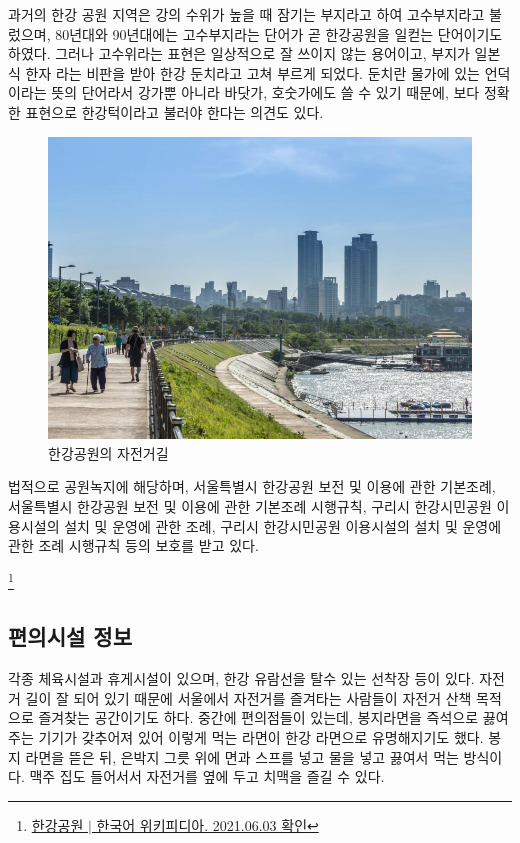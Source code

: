 
과거의 한강 공원 지역은 강의 수위가 높을 때 잠기는 부지라고 하여 고수부지라고 
불렀으며, 80년대와 90년대에는 고수부지라는 단어가 곧 한강공원을 일컫는 단어이기도 
하였다. 그러나 고수위라는 표현은 일상적으로 잘 쓰이지 않는 용어이고, 부지가 일본식 한자
라는 비판을 받아 한강 둔치라고 고쳐 부르게 되었다. 둔치란 물가에 있는 언덕이라는 
뜻의 단어라서 강가뿐 아니라 바닷가, 호숫가에도 쓸 수 있기 때문에, 보다 정확한 표현으로
한강턱이라고 불러야 한다는 의견도 있다.



\begin{figure}
    \centering
    \includegraphics[width=.6\textwidth]{e_img/ww_-001.jpg}
    \caption{한강공원의 자전거길}
    \label{fig:haryu3}
\end{figure}


법적으로 공원녹지에 해당하며, 서울특별시 한강공원 보전 및 이용에 관한 기본조례,
서울특별시 한강공원 보전 및 이용에 관한 기본조례 시행규칙, 구리시 한강시민공원 이용시설의
 설치 및 운영에 관한 조례, 구리시 한강시민공원 이용시설의 설치 및 운영에 관한
조례 시행규칙 등의 보호를 받고 있다.

\footnote{\href{https://ko.wikipedia.org/wiki/한강공원}{한강공원 $|$ 한국어 위키피디아. 2021.06.03 확인}}
\subsection{편의시설 정보}

각종 체육시설과 휴게시설이 있으며, 한강 유람선을 탈수 있는 선착장 등이 있다. 자전거
길이 잘 되어 있기 때문에 서울에서 자전거를 즐겨타는 사람들이 자전거 산책 목적으로
즐겨찾는 공간이기도 하다. 중간에 편의점들이 있는데, 봉지라면을 즉석으로 끓여주는
기기가 갖추어져 있어 이렇게 먹는 라면이 한강 라면으로 유명해지기도 했다. 봉지 라면을
뜯은 뒤, 은박지 그릇 위에 면과 스프를 넣고 물을 넣고 끓여서 먹는 방식이다. 맥주 집도 
들어서서 자전거를 옆에 두고 치맥을 즐길 수 있다.


